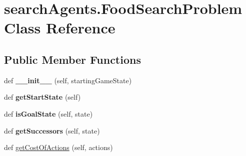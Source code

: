 \hypertarget{classsearch_agents_1_1_food_search_problem}{}\section{search\+Agents.\+Food\+Search\+Problem Class Reference}
\label{classsearch_agents_1_1_food_search_problem}
\subsection*{Public Member Functions}
\begin{DoxyCompactItemize}
\item 
\mbox{\label{classsearch_agents_1_1_food_search_problem_aceb4d4d29de50f107fa13e25e7d0be74}} 
def {\bfseries \+\_\+\+\_\+init\+\_\+\+\_\+} (self, starting\+Game\+State)
\item 
\mbox{\label{classsearch_agents_1_1_food_search_problem_af3ef21c5f2c240580642904a471d7073}} 
def {\bfseries get\+Start\+State} (self)
\item 
\mbox{\label{classsearch_agents_1_1_food_search_problem_abc299d7e9ab66fa115f43baa0fdd7fbf}} 
def {\bfseries is\+Goal\+State} (self, state)
\item 
\mbox{\label{classsearch_agents_1_1_food_search_problem_aa892375d4b57691f981999a870c6734d}} 
def {\bfseries get\+Successors} (self, state)
\item 
def \hyperlink{classsearch_agents_1_1_food_search_problem_a77b77a7182bb81a22a67f0b48170da2c}{get\+Cost\+Of\+Actions} (self, actions)
\end{DoxyCompactItemize}
